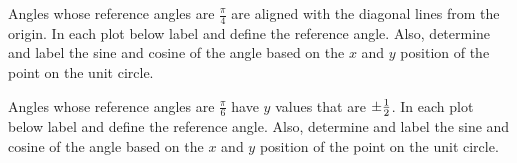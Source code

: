 \clearpage

Angles whose reference angles are $\frac{\pi}{4}$ are aligned with the
diagonal lines from the origin. In each plot below label and define
the reference angle. Also, determine and label the sine and cosine of
the angle based on the $x$ and $y$ position of the point on the unit
circle.

\begin{minipage}{0.5\linewidth}
\end{minipage}
\begin{minipage}{0.5\linewidth}
\end{minipage}

\vspace{3em}

\begin{minipage}{0.5\linewidth}
\end{minipage}
\begin{minipage}{0.5\linewidth}
\end{minipage}

\vfill

\clearpage

Angles whose reference angles are $\frac{\pi}{6}$ have $y$ values that
are $\pm\mbox{$\frac{1}{2}$}$. In each plot below label and define the reference
angle. Also, determine and label the sine and cosine of the angle
based on the $x$ and $y$ position of the point on the unit circle.


